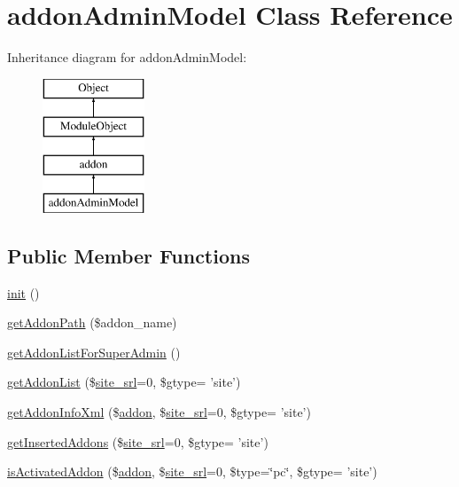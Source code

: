 \hypertarget{classaddonAdminModel}{\section{addon\+Admin\+Model Class Reference}
\label{classaddonAdminModel}
}
Inheritance diagram for addon\+Admin\+Model\+:\begin{figure}[H]
\begin{center}
\leavevmode
\includegraphics[height=4.000000cm]{classaddonAdminModel}
\end{center}
\end{figure}
\subsection*{Public Member Functions}
\begin{DoxyCompactItemize}
\item 
\hyperlink{classaddonAdminModel_aed6091be1c24a8c5fcf101b664300b00}{init} ()
\item 
\hyperlink{classaddonAdminModel_ab4fea679a0059be718e449b31a88c46f}{get\+Addon\+Path} (\$addon\+\_\+name)
\item 
\hyperlink{classaddonAdminModel_a056c3d3567ae957b9a5635397dd78b9e}{get\+Addon\+List\+For\+Super\+Admin} ()
\item 
\hyperlink{classaddonAdminModel_abd8052e647a7ea4224e0680663fca536}{get\+Addon\+List} (\$\hyperlink{ko_8install_8php_a8b1406b4ad1048041558dce6bfe89004}{site\+\_\+srl}=0, \$gtype= 'site')
\item 
\hyperlink{classaddonAdminModel_a9019b55b1c67ac658259bfd78bd74e4a}{get\+Addon\+Info\+Xml} (\$\hyperlink{classaddon}{addon}, \$\hyperlink{ko_8install_8php_a8b1406b4ad1048041558dce6bfe89004}{site\+\_\+srl}=0, \$gtype= 'site')
\item 
\hyperlink{classaddonAdminModel_a59cd95bf540c78d29043029f292c201b}{get\+Inserted\+Addons} (\$\hyperlink{ko_8install_8php_a8b1406b4ad1048041558dce6bfe89004}{site\+\_\+srl}=0, \$gtype= 'site')
\item 
\hyperlink{classaddonAdminModel_ac5b47c66d9e5d0daea7e857676f2b7ec}{is\+Activated\+Addon} (\$\hyperlink{classaddon}{addon}, \$\hyperlink{ko_8install_8php_a8b1406b4ad1048041558dce6bfe89004}{site\+\_\+srl}=0, \$type=\char`\"{}pc\char`\"{}, \$gtype= 'site')
\end{DoxyCompactItemize}
